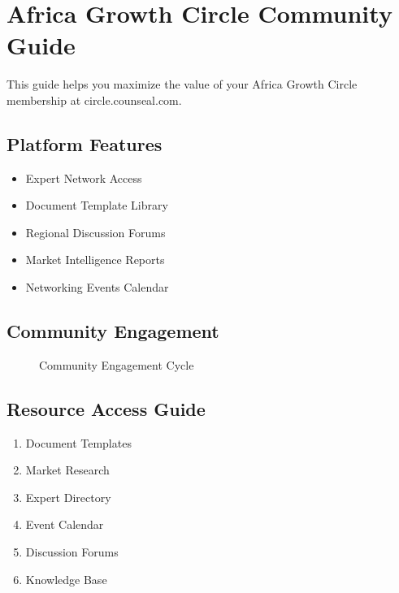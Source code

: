 
\chapter{Africa Growth Circle Community Guide}

\begin{importantbox}
    This guide helps you maximize the value of your Africa Growth Circle membership at circle.counseal.com.
\end{importantbox}


\section{Platform Features}
\begin{tcolorbox}[colback=white,colframe=primarydark,title=\textbf{Key Resources}]
    \begin{itemize}
        \item Expert Network Access
        \item Document Template Library
        \item Regional Discussion Forums
        \item Market Intelligence Reports
        \item Networking Events Calendar
    \end{itemize}
\end{tcolorbox}


\section{Community Engagement}
\begin{figure}[h]
    \centering
    \caption{Community Engagement Cycle}
\end{figure}


\section{Resource Access Guide}
\begin{tcolorbox}[colback=white,colframe=primary,title=\textbf{Digital Resources}]
    \begin{enumerate}
        \item Document Templates
        \item Market Research
        \item Expert Directory
        \item Event Calendar
        \item Discussion Forums
        \item Knowledge Base
    \end{enumerate}
\end{tcolorbox}


